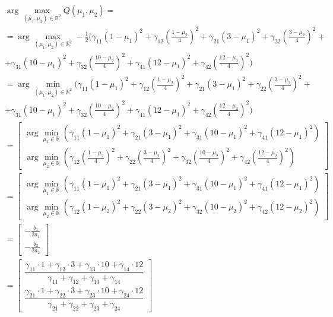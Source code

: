 \documentclass[12pt]{article}
\begin{document}
\begin{enumerate}
		\begin{align*}
		&\arg \max_{(\mu_1,\mu_2)\in \mathbb{R}^2} Q(\mu_1,\mu_2) =\\
		&=\arg \max_{(\mu_1,\mu_2)\in \mathbb{R}^2} - \frac{1}{2} (
		\gamma_{11} (1-\mu_1)^2 + 
		\gamma_{12} \left(\frac{1-\mu_2}{4}\right)^2 + 
		\gamma_{21} (3-\mu_1)^2 + 
		\gamma_{22} \left(\frac{3-\mu_2}{4}\right)^2 + \\
		&+\gamma_{31} (10-\mu_1)^2 + 
		\gamma_{32} \left(\frac{10-\mu_2}{4}\right)^2 + 
		\gamma_{41} (12-\mu_1)^2 + 
		\gamma_{42} \left(\frac{12-\mu_2}{4}\right)^2
		)\\
		&=\arg \min_{(\mu_1,\mu_2) \in \mathbb{R}^2} (
		\gamma_{11} (1-\mu_1)^2 + 
		\gamma_{12} \left(\frac{1-\mu_2}{4}\right)^2 + 
		\gamma_{21} (3-\mu_1)^2 + 
		\gamma_{22} \left(\frac{3-\mu_2}{4}\right)^2 + \\
		&+\gamma_{31} (10-\mu_1)^2 + 
		\gamma_{32} \left(\frac{10-\mu_2}{4}\right)^2 + 
		\gamma_{41} (12-\mu_1)^2 + 
		\gamma_{42} \left(\frac{12-\mu_2}{4}\right)^2
		)
		\end{align*}
		\begin{align*}
		&=\begin{bmatrix}
		\arg \min_{\mu_1 \in \mathbb{R}} (\gamma_{11}(1 - \mu_1)^2 + \gamma_{21}(3 - \mu_1)^2 + \gamma_{31}(10 -\mu_1)^2 + \gamma_{41}(12 - \mu_1)^2)\\
		\arg \min_{\mu_2 \in \mathbb{R}} \left(\gamma_{12} \left(\frac{1-\mu_2}{4}\right)^2 + \gamma_{22} \left(\frac{3-\mu_2}{4}\right)^2 + \gamma_{32} \left(\frac{10-\mu_2}{4}\right)^2 + \gamma_{42} \left(\frac{12-\mu_2}{4}\right)^2\right)
		\end{bmatrix}\\
		&=\begin{bmatrix}
		\arg \min_{\mu_1 \in \mathbb{R}} (\gamma_{11}(1 - \mu_1)^2 + \gamma_{21}(3 - \mu_1)^2 + \gamma_{31}(10 -\mu_1)^2 + \gamma_{41}(12 - \mu_1)^2)\\
		\arg \min_{\mu_2 \in \mathbb{R}} \left(\gamma_{12} \left(1-\mu_2\right)^2 + \gamma_{22} \left(3-\mu_2\right)^2 + \gamma_{32} \left(10-\mu_2\right)^2 + \gamma_{42} \left(12-\mu_2\right)^2\right)
		\end{bmatrix}\\
		&=\begin{bmatrix}
		-\frac{b_1}{2a_1}\\
		-\frac{b_2}{2a_2}
		\end{bmatrix}\\
		&=\begin{bmatrix}
		\dfrac{\gamma_{11}\cdot 1 + \gamma_{12}\cdot 3 + \gamma_{13}\cdot 10+ \gamma_{14}\cdot 12}{\gamma_{11}+ \gamma_{12}+ \gamma_{13}+ \gamma_{14}}\\
		\dfrac{\gamma_{21}\cdot 1 + \gamma_{22}\cdot 3 + \gamma_{23}\cdot 10+ \gamma_{24}\cdot 12}{\gamma_{21}+ \gamma_{22}+ \gamma_{23}+ \gamma_{24}}
		\end{bmatrix}
		\end{align*}
		

\end{enumerate}
\end{document}
